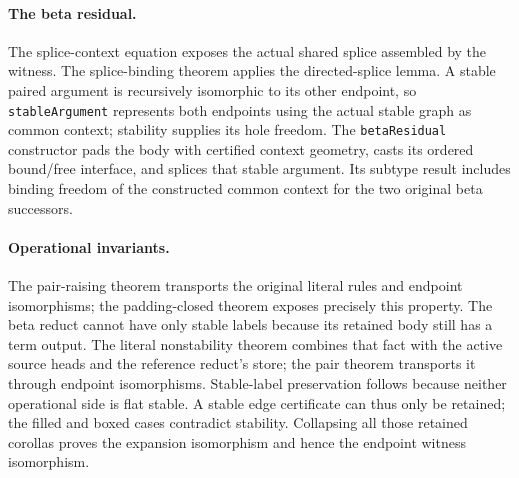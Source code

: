 \paragraph{The beta residual.}
The splice-context equation exposes the actual shared splice assembled by
the witness. The splice-binding theorem applies the directed-splice lemma.
A stable paired argument is recursively isomorphic to its other endpoint,
so \texttt{stableArgument} represents both endpoints using the actual stable
graph as common context; stability supplies its hole freedom. The
\texttt{betaResidual} constructor pads the body with certified context
geometry, casts its ordered bound/free interface, and splices that stable
argument. Its subtype result includes binding freedom of the constructed
common context for the two original beta successors.

\par{}

\paragraph{Operational invariants.}
The pair-raising theorem transports the original literal rules and endpoint
isomorphisms; the padding-closed theorem exposes precisely this property.
The beta reduct cannot have only stable labels because its retained body
still has a term output. The literal nonstability theorem combines that
fact with the active source heads and the reference reduct's store; the
pair theorem transports it through endpoint isomorphisms. Stable-label
preservation follows because neither operational side is flat stable.
A stable edge certificate can thus only be retained; the filled and boxed
cases contradict stability. Collapsing all those retained corollas proves
the expansion isomorphism and hence the endpoint witness isomorphism.

\par{}

